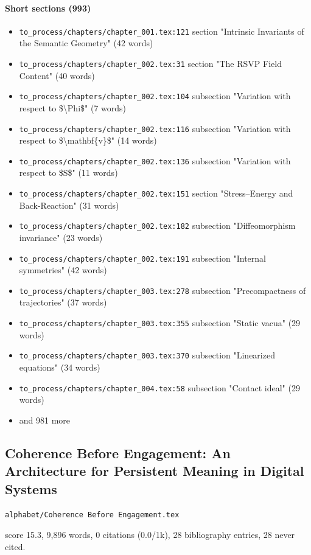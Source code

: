 \documentclass[11pt]{article}
\newcommand{\loc}[1]{{\small\color{muted}\texttt{#1}}}
\begin{document}
\paragraph{Short sections (993)}
\begin{itemize}
\item \loc{to\_process/\allowbreak{}chapters/\allowbreak{}chapter\_001.tex:121} section "Intrinsic Invariants of the Semantic Geometry" (42 words)
\item \loc{to\_process/\allowbreak{}chapters/\allowbreak{}chapter\_002.tex:31} section "The RSVP Field Content" (40 words)
\item \loc{to\_process/\allowbreak{}chapters/\allowbreak{}chapter\_002.tex:104} subsection "Variation with respect to \$\textbackslash{}Phi\$" (7 words)
\item \loc{to\_process/\allowbreak{}chapters/\allowbreak{}chapter\_002.tex:116} subsection "Variation with respect to \$\textbackslash{}mathbf\{v\}\$" (14 words)
\item \loc{to\_process/\allowbreak{}chapters/\allowbreak{}chapter\_002.tex:136} subsection "Variation with respect to \$S\$" (11 words)
\item \loc{to\_process/\allowbreak{}chapters/\allowbreak{}chapter\_002.tex:151} section "Stress--Energy and Back-Reaction" (31 words)
\item \loc{to\_process/\allowbreak{}chapters/\allowbreak{}chapter\_002.tex:182} subsection "Diffeomorphism invariance" (23 words)
\item \loc{to\_process/\allowbreak{}chapters/\allowbreak{}chapter\_002.tex:191} subsection "Internal symmetries" (42 words)
\item \loc{to\_process/\allowbreak{}chapters/\allowbreak{}chapter\_003.tex:278} subsection "Precompactness of trajectories" (37 words)
\item \loc{to\_process/\allowbreak{}chapters/\allowbreak{}chapter\_003.tex:355} subsection "Static vacua" (29 words)
\item \loc{to\_process/\allowbreak{}chapters/\allowbreak{}chapter\_003.tex:370} subsection "Linearized equations" (34 words)
\item \loc{to\_process/\allowbreak{}chapters/\allowbreak{}chapter\_004.tex:58} subsection "Contact ideal" (29 words)
\item[] {\color{muted}\small and 981 more}
\end{itemize}
\subsection{Coherence Before Engagement: An Architecture for Persistent Meaning in Digital Systems}
\loc{alphabet/\allowbreak{}Coherence Before Engagement.tex}\par
score 15.3, 9,896 words, 0 citations (0.0/1k), 28 bibliography entries, 28 never cited.
\end{document}
